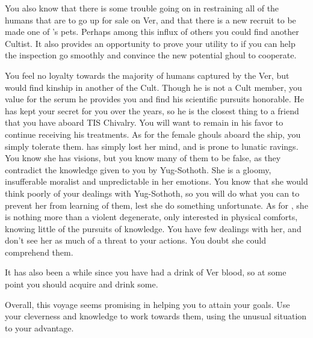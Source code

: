 \documentclass[char]{guildcamp4}
\begin{document}
You also know that there is some trouble going on in restraining all of the humans that are to go up for sale on Ver, and that there is a new recruit to be made one of \cVone{}'s pets. Perhaps among this influx of others you could find another Cultist. It also provides an opportunity to prove your utility to \cVone{} if you can help the inspection go smoothly and convince the new potential ghoul to cooperate. 

You feel no loyalty towards the majority of humans captured by the Ver, but would find kinship in another of the Cult. Though he is not a Cult member, you value \cJames{} for the serum he provides you and find his scientific pursuits honorable. He has kept your secret for you over the years, so he is the closest thing to a friend that you have aboard TIS Chivalry. You will want to remain in his favor to continue receiving his treatments. As for the female ghouls aboard the ship, you simply tolerate them. \cJoan{} has simply lost her mind, and is prone to lunatic ravings. You know she has visions, but you know many of them to be false, as they contradict the knowledge given to you by Yug-Sothoth. She is a gloomy, insufferable moralist and unpredictable in her emotions. You know that she would think poorly of your dealings with Yug-Sothoth, so you will do what you can to prevent her from learning of them, lest she do something unfortunate. As for \cJulie{}, she is nothing more than a violent degenerate, only interested in physical comforts, knowing little of the pursuits of knowledge. You have few dealings with her, and don't see her as much of a threat to your actions. You doubt she could comprehend them.

It has also been a while since you have had a drink of Ver blood, so at some point you should acquire and drink some.

Overall, this voyage seems promising in helping you to attain your goals. Use your cleverness and knowledge to work towards them, using the unusual situation to your advantage.
\end{document}
